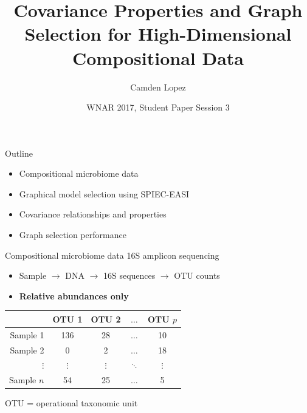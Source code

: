 \documentclass[professionalfonts]{beamer}
\title{Covariance Properties and Graph Selection for High-Dimensional Compositional Data}
\author{Camden Lopez}
\date{WNAR 2017, Student Paper Session 3}
\newcommand{\cov}{\operatorname{cov}}
\begin{document}
\maketitle

\begin{frame}{Outline}
\begin{itemize}
\item Compositional microbiome data
\item Graphical model selection using SPIEC-EASI
\item Covariance relationships and properties
\item Graph selection performance
\end{itemize}
\end{frame}

\begin{frame}{Compositional microbiome data}
16S amplicon sequencing
\begin{itemize}
\item Sample $\rightarrow$ DNA $\rightarrow$ 16S sequences $\rightarrow$ OTU counts
\item \textbf{Relative abundances only}
\end{itemize}
\begin{center}
\begin{tabular}{r|cccc}
& OTU 1 & OTU 2 & $\dots$ & OTU $p$ \\
\hline
Sample 1 & 136 & 28 & $\dots$ & 10 \\
Sample 2 & 0 & 2 & $\dots$ & 18 \\
$\vdots$ & $\vdots$ & $\vdots$ & $\ddots$ & $\vdots$ \\
Sample $n$ & 54 & 25 & $\dots$ & 5
\end{tabular}

OTU = operational taxonomic unit
\end{center}
\end{frame}

%
\end{document}
